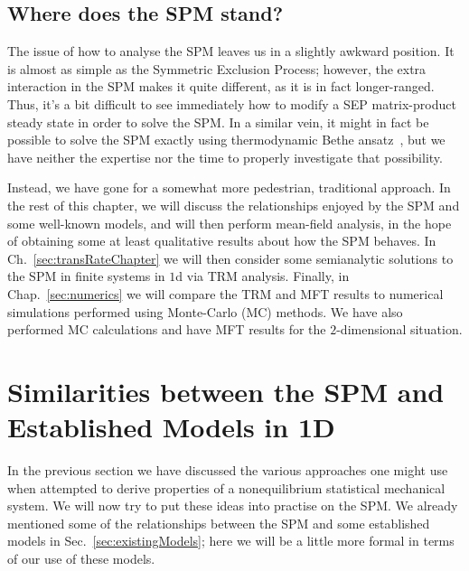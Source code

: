 \subsection{Where does the SPM stand?} \label{sec:spmStatus}
The issue of how to analyse the SPM leaves us in a slightly awkward position. It is almost as simple
as the Symmetric Exclusion Process; however, the extra interaction in the SPM makes it quite
different, as it is in fact longer-ranged. Thus, it's a bit difficult to see immediately how to
modify a SEP matrix-product steady state in order to solve the SPM. In a similar vein, it might 
in fact be possible to solve the SPM exactly using thermodynamic Bethe ansatz~\cite{van2016},
but we have neither
the expertise nor the time to properly investigate that possibility.

Instead, we have gone for a somewhat more pedestrian, traditional approach. In the rest of this
chapter, we will discuss the relationships enjoyed by the SPM and some well-known models,
and will then perform  mean-field analysis, in the hope of obtaining some at least qualitative
results about how the SPM behaves. In Ch.~\ref{sec:transRateChapter} we will then consider some semianalytic solutions to the SPM
in finite systems in $1$d via TRM analysis. Finally, in Chap.~\ref{sec:numerics} we will compare the TRM and MFT results to numerical simulations performed using Monte-Carlo (MC) methods. We have also performed
MC calculations and have MFT results for the $2$-dimensional situation.


\section{Similarities between the SPM and Established Models in 1D}
In the previous section we have discussed the various approaches one might use when attempted to derive properties of a nonequilibrium statistical mechanical system. We will now try to put these ideas into practise on the SPM. We already mentioned some of the relationships between the SPM
and some established models in Sec.~\ref{sec:existingModels}; here we will be a little more formal
in terms of our use of these models.



